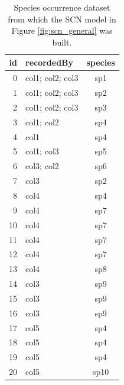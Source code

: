 {\begin{table}[!ht]
  \caption{Species occurrence dataset from which the SCN model in Figure \ref{fig:scn_general} was built.}
  \begin{center}
  \begin{tabular}{r l c}
      id & recordedBy & species \\
      \hline
      0 & col1; col2; col3 & sp1 \\
      1 & col1; col2; col3 & sp2 \\
      2 & col1; col2; col3 & sp3 \\
      3 & col1; col2 & sp4 \\
      4 & col1 & sp4 \\
      5 & col1; col3 & sp5 \\
      6 & col3; col2 & sp6 \\
      7 & col3 & sp2 \\
      8 & col4 & sp4 \\
      9 & col4 & sp7 \\
      10 & col4 & sp7 \\
      11 & col4 & sp7 \\
      12 & col4 & sp7 \\
      13 & col4 & sp8 \\
      14 & col3 & sp9 \\
      15 & col3 & sp9 \\
      16 & col3 & sp9 \\
      17 & col5 & sp4 \\
      18 & col5 & sp4 \\
      19 & col5 & sp4 \\
      20 & col5 & sp10 \\
       \hline
  \end{tabular}
  \end{center}
  \label{table:scn_example_dataset}
\end{table}

}
